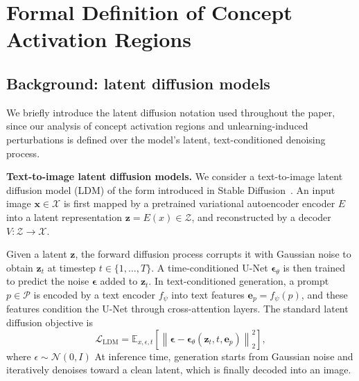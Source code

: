 \section{Formal Definition of Concept Activation Regions}
\label{app:concept_regions}
\subsection{Background: latent diffusion models}\label{app:background}
We briefly introduce the latent diffusion notation used throughout the paper, since our analysis of concept activation regions and unlearning-induced perturbations is defined over the model's latent, text-conditioned denoising process.

\textbf{Text-to-image latent diffusion models.}
We consider a text-to-image latent diffusion model (LDM) of the form introduced in Stable Diffusion~\citep{rombach2022high}.
An input image $\mathbf{x} \in \mathcal{X}$ is first mapped by a pretrained variational autoencoder encoder $E$ into a latent representation 
$\mathbf{z} = E(x) \in \mathcal{Z}$, and reconstructed by a decoder $V : \mathcal{Z} \rightarrow \mathcal{X}$. 

Given a latent $\mathbf{z}$, the forward diffusion process corrupts it with Gaussian noise to obtain $\mathbf{z}_t$ at timestep $t \in \{1,\dots,T\}$. 
A time-conditioned U-Net $\boldsymbol{\epsilon}_\theta$ is then trained to predict the noise $\boldsymbol{\epsilon}$ 
added to $\mathbf{z}_t$. 
In text-conditioned generation, a prompt $p \in \mathcal{P}$ is encoded by a text encoder $f_{\psi}$ into text features $\mathbf{e}_p = f_{\psi}(p)$, and these features condition the U-Net through cross-attention layers. 
The standard latent diffusion objective is
\begin{equation}
\label{eq:ldm_loss}
\mathcal{L}_{\mathrm{LDM}}
=
\mathbb{E}_{x,\epsilon,t}
\left[
\left\|
\boldsymbol{\epsilon} - \boldsymbol{\epsilon}_\theta(\mathbf{z}_t, t, \mathbf{e}_p)
\right\|_2^2
\right],
\end{equation}
where $\epsilon \sim \mathcal{N}(0,I)$ 
At inference time, generation starts from Gaussian noise and iteratively denoises toward a clean latent, which is finally decoded into an image.

